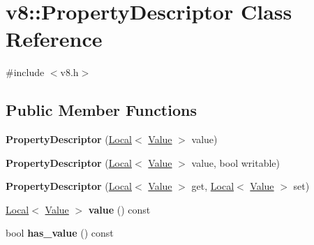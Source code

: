 \hypertarget{classv8_1_1PropertyDescriptor}{}\section{v8\+:\+:Property\+Descriptor Class Reference}
\label{classv8_1_1PropertyDescriptor}


{\ttfamily \#include $<$v8.\+h$>$}

\subsection*{Public Member Functions}
\begin{DoxyCompactItemize}
\item 
\mbox{\label{classv8_1_1PropertyDescriptor_a82ac167b677a5b8689b7a54220848281}} 
{\bfseries Property\+Descriptor} (\mbox{\hyperlink{classv8_1_1Local}{Local}}$<$ \mbox{\hyperlink{classv8_1_1Value}{Value}} $>$ value)
\item 
\mbox{\label{classv8_1_1PropertyDescriptor_a9e9c501803e6cf9a75352ae6354c4dc0}} 
{\bfseries Property\+Descriptor} (\mbox{\hyperlink{classv8_1_1Local}{Local}}$<$ \mbox{\hyperlink{classv8_1_1Value}{Value}} $>$ value, bool writable)
\item 
\mbox{\label{classv8_1_1PropertyDescriptor_a537ec17ed2957629ec633a7c04907dd2}} 
{\bfseries Property\+Descriptor} (\mbox{\hyperlink{classv8_1_1Local}{Local}}$<$ \mbox{\hyperlink{classv8_1_1Value}{Value}} $>$ get, \mbox{\hyperlink{classv8_1_1Local}{Local}}$<$ \mbox{\hyperlink{classv8_1_1Value}{Value}} $>$ set)
\item 
\mbox{\label{classv8_1_1PropertyDescriptor_ad3834d267a32460d2dd1ec35ecb6c2d8}} 
\mbox{\hyperlink{classv8_1_1Local}{Local}}$<$ \mbox{\hyperlink{classv8_1_1Value}{Value}} $>$ {\bfseries value} () const
\item 
\mbox{\label{classv8_1_1PropertyDescriptor_a402608f890da55ed63a8a1b86f5c9693}} 
bool {\bfseries has\+\_\+value} () const
\item 
\mbox{\label{classv8_1_1PropertyDescriptor_a28991c18acb30e8a3f68bc2c9f622dcc}} 

\end{DoxyCompactItemize}
